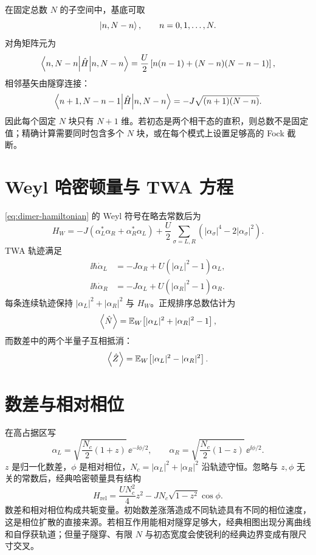 在固定总数 $N$ 的子空间中，基底可取
\begin{equation}
  \left\lvert n,N-n\right\rangle,\qquad n=0,1,\ldots,N.
\end{equation}
对角矩阵元为
\begin{equation}
  \left\langle n,N-n\middle\vert \hat H\middle\vert n,N-n\right\rangle
  =\frac{U}{2}\left[n(n-1)+(N-n)(N-n-1)\right],
\end{equation}
相邻基矢由隧穿连接：
\begin{equation}
  \left\langle n+1,N-n-1\middle\vert \hat H\middle\vert n,N-n\right\rangle
  =-J\sqrt{(n+1)(N-n)}.
  \label{eq:dimer-matrix-element}
\end{equation}
因此每个固定 $N$ 块只有 $N+1$ 维。若初态是两个相干态的直积，则总数不是固定值；精确计算需要同时包含多个 $N$ 块，或在每个模式上设置足够高的 Fock 截断。

\section{Weyl 哈密顿量与 TWA 方程}

\cref{eq:dimer-hamiltonian} 的 Weyl 符号在略去常数后为
\begin{equation}
  H_W=-J(\alpha_L^*\alpha_R+\alpha_R^*\alpha_L)
  +\frac{U}{2}\sum_{\sigma=L,R}
  \left(|\alpha_\sigma|^4-2|\alpha_\sigma|^2\right).
  \label{eq:dimer-weyl}
\end{equation}
TWA 轨迹满足
\begin{align}
  \ii\hbar\dot\alpha_L
  &=-J\alpha_R+U(|\alpha_L|^2-1)\alpha_L,\\
  \ii\hbar\dot\alpha_R
  &=-J\alpha_L+U(|\alpha_R|^2-1)\alpha_R.
  \label{eq:dimer-twa}
\end{align}
每条连续轨迹保持 $|\alpha_L|^2+|\alpha_R|^2$ 与 $H_W$。正规排序总数估计为
\begin{equation}
  \left\langle \hat N\right\rangle
  =\mathbb{E}_{W}\!\left[|\alpha_L|^2+|\alpha_R|^2-1\right],
  \label{eq:dimer-total-estimator}
\end{equation}
而数差中的两个半量子互相抵消：
\begin{equation}
  \left\langle \hat Z\right\rangle
  =\mathbb{E}_{W}\!\left[|\alpha_L|^2-|\alpha_R|^2\right].
\end{equation}

\section{数差与相对相位}

在高占据区写
\begin{equation}
  \alpha_L=\sqrt{\frac{N_c}{2}(1+z)}\,\ee^{-\ii\phi/2},
  \qquad
  \alpha_R=\sqrt{\frac{N_c}{2}(1-z)}\,\ee^{\ii\phi/2}.
\end{equation}
$z$ 是归一化数差，$\phi$ 是相对相位，$N_c=|\alpha_L|^2+|\alpha_R|^2$ 沿轨迹守恒。忽略与 $z,\phi$ 无关的常数后，经典哈密顿量具有结构
\begin{equation}
  H_{\mathrm{rel}}
  =\frac{UN_c^2}{4}z^2
  -JN_c\sqrt{1-z^2}\cos\phi.
  \label{eq:josephson-classical-hamiltonian}
\end{equation}
数差和相对相位构成共轭变量。初始数差涨落造成不同轨迹具有不同的相位速度，这是相位扩散的直接来源。若相互作用能相对隧穿足够大，经典相图出现分离曲线和自俘获轨道；但量子隧穿、有限 $N$ 与初态宽度会使锐利的经典边界变成有限尺寸交叉。

